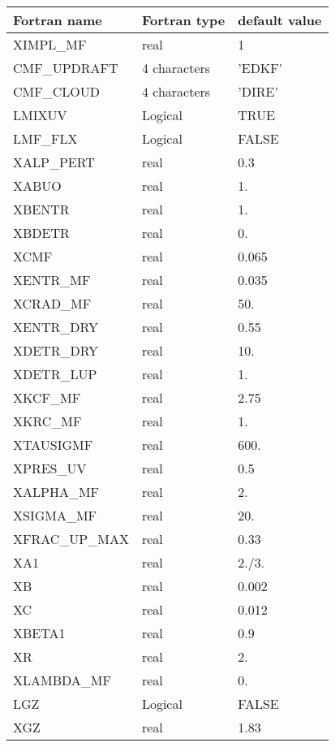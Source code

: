 
\begin{longtable} {|p{}|p{}|p{}|}
\hline
Fortran name &  Fortran type & default value \\
\hline 
\endhead
\hline
\endfoot
XIMPL\_MF      &  real         &   1        \\
CMF\_UPDRAFT   &  4 characters &   'EDKF'   \\
CMF\_CLOUD     &  4 characters &   'DIRE'   \\
LMIXUV         &  Logical      &    TRUE    \\ 
LMF\_FLX       &  Logical      &    FALSE   \\
XALP\_PERT     &  real         &    0.3     \\
XABUO          &  real         &    1.      \\
XBENTR         &  real         &    1.      \\
XBDETR         &  real         &    0.      \\
XCMF           &  real         &    0.065   \\
XENTR\_MF      &  real         &    0.035   \\
XCRAD\_MF      &  real         &    50.     \\
XENTR\_DRY     &  real         &    0.55    \\
XDETR\_DRY     &  real         &    10.     \\
XDETR\_LUP     &  real         &    1.      \\
XKCF\_MF       &  real         &    2.75    \\
XKRC\_MF       &  real         &    1.      \\
XTAUSIGMF      &  real         &    600.    \\
XPRES\_UV      &  real         &    0.5     \\
XALPHA\_MF     &  real         &    2.      \\
XSIGMA\_MF     &  real         &    20.     \\
XFRAC\_UP\_MAX &  real         &    0.33    \\
XA1            &  real         &    2./3.   \\
XB             &  real         &    0.002   \\
XC             &  real         &    0.012   \\
XBETA1         &  real         &    0.9     \\
XR             &  real         &    2.      \\
XLAMBDA\_MF    &  real         &    0.      \\
LGZ            &  Logical      &    FALSE   \\
XGZ            &  real         &    1.83    \\
\end{longtable}

